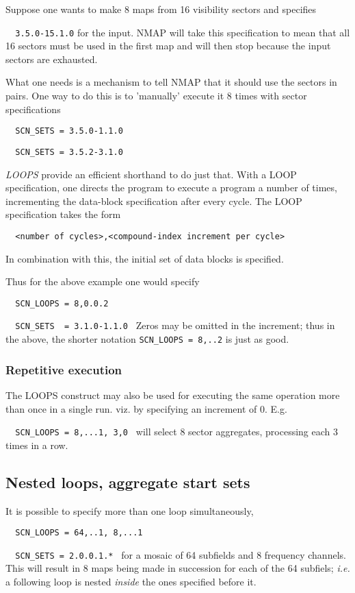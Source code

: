 	Suppose one wants to make 8 maps from 16 visibility sectors and specifies
\bi
\item[] \verb/  3.5.0-15.1.0/
\ei 
for the input. NMAP will take this specification to mean that all 16 sectors must be used in the first map and will then stop because the input sectors are exhausted.

	What one needs is a mechanism to tell NMAP that it should use the sectors in pairs. One way to do this is to 'manually' execute it 8 times with sector specifications
\spbegin
\bi
\item[] \verb/  SCN_SETS = 3.5.0-1.1.0/
\item[] \verb/  SCN_SETS = 3.5.2-3.1.0/
\item[] 
\ei
\spend
	{\em LOOPS} provide an efficient shorthand to do just that. With a LOOP specification, one directs the program to execute a program a number of times, incrementing the data-block specification after every cycle. The LOOP specification takes the form
\bi
\item[] \verb/  <number of cycles>,<compound-index increment per cycle>/
\ei

In combination with this, the initial set of data blocks is specified.

	Thus for the above example one would specify
\spbegin
\bi
\item[] \verb/  SCN_LOOPS = 8,0.0.2 /
\item[] \verb/  SCN_SETS  = 3.1.0-1.1.0 /
\ei
\spend 
Zeros may be omitted in the increment; thus in the above, the shorter notation
\verb/SCN_LOOPS = 8,..2/ is just as good.


\subsubsection{ Repetitive execution }
\label{.repetitive}

	The LOOPS construct may also be used for executing the same operation more than once in a single run. viz. by specifying an increment of 0. E.g.
\bi
\item[]	\verb/	SCN_LOOPS = 8,...1, 3,0 /
\ei
will select 8 sector aggregates, processing each 3 times in a row.  


\subsection{ Nested loops, aggregate start sets }
\label{.nested.loops}

	It is possible to specify more than one loop simultaneously, \eg
\spbegin
\bi
\item[] \verb/  SCN_LOOPS = 64,..1, 8,...1/
\item[] \verb/  SCN_SETS = 2.0.0.1.* /
\ei
\spend for a mosaic of 64 subfields and 8 frequency channels. This will result in 8 maps being made in succession for each of the 64 subfiels; {\em i.e.} a following loop is nested {\em inside} the ones specified before it.

